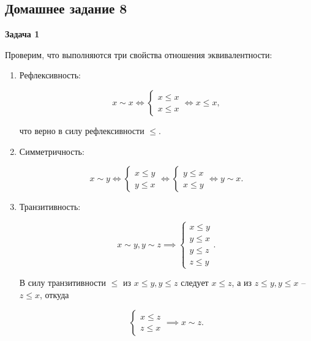 \subsection{Домашнее задание 8}


	\begin{center}
    \textbf{Задача 1}
\end{center}
		Проверим, что выполняются три свойства отношения эквивалентности:

		\begin{enumerate}
			\item Рефлексивность:

			\begin{equation*}
				x \sim x \Longleftrightarrow \begin{cases}
					x \le x \\
					x \le x
				\end{cases} \Longleftrightarrow x \le x,
			\end{equation*}

			что верно в силу рефлексивности $\le$.

			\item Симметричность:

			\begin{equation*}
				x \sim y \Longleftrightarrow \begin{cases}
					x \le y \\
					y \le x
				\end{cases} \Longleftrightarrow \begin{cases}
					y \le x \\
					x \le y
				\end{cases} \Longleftrightarrow y \sim x.
			\end{equation*}

			\item Транзитивность:

			\begin{equation*}
				x \sim y, y \sim z \implies \begin{cases}
					x \le y \\
					y \le x \\
					y \le z \\
					z \le y
				\end{cases}.
			\end{equation*}

			В силу транзитивности $\le$ из $x \le y, y \le z$ следует $x \le z$, а из $z \le y, y \le x$ -- $z \le x$, откуда

			\begin{equation*}
				\begin{cases}
					x \le z \\
					z \le x
				\end{cases} \implies x \sim z.
			\end{equation*}
		\end{enumerate}


